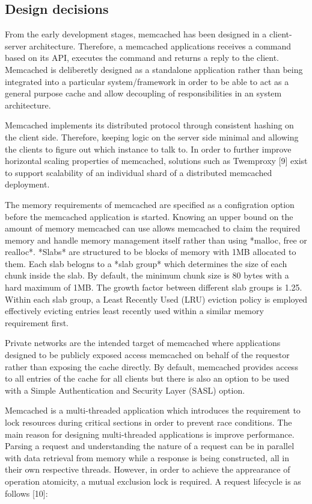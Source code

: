 \subsection{Design decisions}
From the early development stages, memcached has been designed in a client-server architecture. Therefore, a memcached applications receives a command based on its API, executes the command and returns a reply to the client. Memcached is deliberetly designed as a standalone application rather than being integrated into a particular system/framework in order to be able to act as a general purpose cache and allow decoupling of responsibilities in an system architecture.

Memcached implements its distributed protocol through consistent hashing on the client side. Therefore, keeping logic on the server side minimal and allowing the clients to figure out which instance to talk to. In order to further improve horizontal scaling properties of memcached, solutions such as Twemproxy [9] exist to support scalability of an individual shard of a distributed memcached deployment.

The memory requirements of memcached are specified as a configration option before the memcached application is started. Knowing an upper bound on the amount of memory memcached can use allows memcached to claim the required memory and handle memory management itself rather than using *malloc, free or realloc*. *Slabs* are structured to be blocks of memory with 1MB allocated to them. Each slab belogns to a *slab group* which determines the size of each chunk inside the slab. By default, the minimum chunk size is 80 bytes with a hard maximum of 1MB. The growth factor between different slab groups is 1.25. Within each slab group, a Least Recently Used (LRU) eviction policy is employed effectively evicting entries least recently used within a similar memory requirement first.

Private networks are the intended target of memcached where applications designed to be publicly exposed access memcached on behalf of the requestor rather than exposing the cache directly. By default, memcached provides access to all entries of the cache for all clients but there is also an option to be used with a Simple Authentication and Security Layer (SASL) option.

Memcached is a multi-threaded application which introduces the requirement to lock resources during critical sections in order to prevent race conditions. The main reason for designing multi-threaded applications is improve performance. Parsing a request and understanding the nature of a request can be in parallel with data retrieval from memory while a response is being constructed, all in their own respective threads. However, in order to achieve the apprearance of operation atomicity, a mutual exclusion lock is required. A request lifecycle is as follows [10]:

